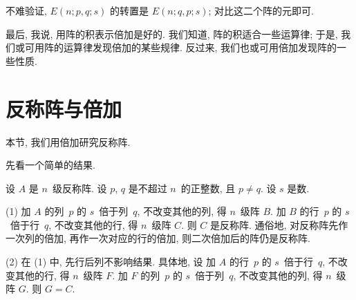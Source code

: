 不难验证, \(E(n; p, q; s)\) 的转置是
\(E(n; q, p; s)\);
对比这二个阵的元即可.

最后, 我说, 用阵的积表示倍加是好的.
我们知道, 阵的积适合一些运算律;
于是, 我们或可用阵的运算律发现倍加的某些规律.
反过来, 我们也或可用倍加发现阵的一些性质.

\section{反称阵与倍加}

本节, 我们用倍加研究反称阵.

先看一个简单的结果.

\begin{theorem}
    设 \(A\) 是 \(n\)~级反称阵.
    设 \(p\), \(q\) 是不超过 \(n\)~的正整数,
    且 \(p \neq q\).
    设 \(s\) 是数.

    (1)
    加 \(A\) 的列~\(p\) 的 \(s\)~倍于列~\(q\),
    不改变其他的列, 得 \(n\)~级阵 \(B\).
    加 \(B\) 的行~\(p\) 的 \(s\)~倍于行~\(q\),
    不改变其他的行, 得 \(n\)~级阵 \(C\).
    则 \(C\) 是反称阵.
    通俗地,
    对反称阵先作一次列的倍加,
    再作一次对应的行的倍加,
    则二次倍加后的阵仍是反称阵.

    (2)
    在 (1) 中, 先行后列不影响结果.
    具体地, 设
    加 \(A\) 的行~\(p\) 的 \(s\)~倍于行~\(q\),
    不改变其他的行, 得 \(n\)~级阵 \(F\).
    加 \(F\) 的列~\(p\) 的 \(s\)~倍于列~\(q\),
    不改变其他的列, 得 \(n\)~级阵 \(G\).
    则 \(G = C\).
\end{theorem}

